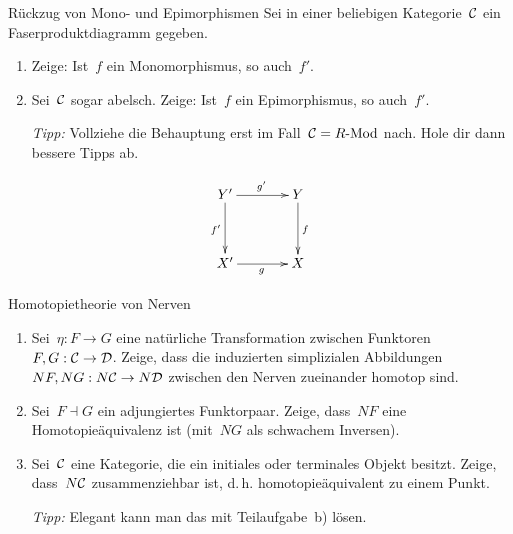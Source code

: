 \documentclass{uebblatt}
\begin{document}

\begin{aufgabe}{Rückzug von Mono- und Epimorphismen}
Sei in einer beliebigen Kategorie~$\mathcal{C}$ ein Faserproduktdiagramm gegeben.
\begin{enumerate}
\item Zeige: Ist~$f$ ein Monomorphismus, so auch~$f'$.
\item Sei~$\mathcal{C}$ sogar abelsch. Zeige: Ist~$f$ ein Epimorphismus, so auch~$f'$.

\emph{Tipp:} Vollziehe die Behauptung erst im Fall~$\mathcal{C} = R\text{-}\mathrm{Mod}$ nach. Hole
dir dann bessere Tipps ab.
\end{enumerate}
\[ \xymatrixcolsep{3pc}\xymatrixrowsep{3pc}\xymatrix{
  Y' \ar[r]^{g'} \ar[d]_{f'} & Y \ar[d]^f \\
  X' \ar[r]_g & X
} \]
\end{aufgabe}

\newpage

\begin{aufgabe}{Homotopietheorie von Nerven}
\begin{enumerate}
\item Sei~$\eta : F \to G$ eine natürliche Transformation zwischen
Funktoren~$F,G : \mathcal{C} \to \mathcal{D}$. Zeige, dass die induzierten simplizialen
Abbildungen~$NF, NG : N\mathcal{C} \to N\mathcal{D}$ zwischen den Nerven zueinander homotop
sind.
\item Sei~$F \dashv G$ ein adjungiertes Funktorpaar. Zeige, dass~$NF$ eine
Homotopieäquivalenz ist (mit~$NG$ als schwachem Inversen).
\item Sei~$\mathcal{C}$ eine Kategorie, die ein initiales oder terminales Objekt
besitzt. Zeige, dass~$N\mathcal{C}$ zusammenziehbar ist, d.\,h. homotopieäquivalent zu
einem Punkt.

\emph{Tipp:} Elegant kann man das mit Teilaufgabe~b) lösen.
\end{enumerate}
\end{aufgabe}
\end{document}
